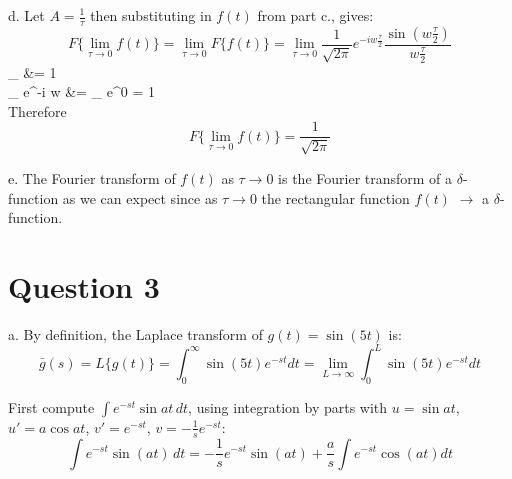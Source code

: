 \documentclass[12pt,twoside]{article}
\begin{document}
\item [d.]
Let $A=\frac{1}{\tau}$ then substituting in $f(t)$	from part c., gives:
\[
	F\{ \lim_{\tau \rightarrow 0} f(t) \} =  \lim_{\tau \rightarrow 0}  F\{ f(t) \} =  \lim_{\tau \rightarrow 0}   \frac{1}  {\sqrt{2 \pi}}  e^{-i w \frac{\tau}{2}} \frac{ \sin(w \frac{\tau}{2}) } {w \frac{\tau}{2}}
\]
\ba
	 \lim_{\theta {}} \frac{\sin(\theta)} {\theta} &= 1 ~  \\
	  \lim_{\tau {}}  e^{-i w } 		&=   \lim_{\tau {}} e^0 = 1 \\
\ea
Therefore
\[
	F\{ \lim_{\tau \rightarrow 0} f(t) \} =  \frac{1}  {\sqrt{2 \pi}} 
\]

\item [e.]
The Fourier transform of $f(t)$ as $\tau  \rightarrow 0$ is the Fourier transform of a $\delta$-function as we can expect since 
as   $\tau  \rightarrow 0$  the rectangular function $f(t)$  $\rightarrow$ a  $\delta$-function.
\ee

\section*{Question 3}

\be

\item [a.]
By definition, the Laplace transform of $g(t) = \sin(5t)$ is:
\[
	\bar{g}(s) = L\{g(t)\} = \int_0^\infty \sin(5t) e^{-st} dt = \lim_{L  \rightarrow \infty}  \int_0^L \sin(5t) e^{-st} dt
\]

First compute $\int e^{-st} \sin at \, dt$, using integration by parts with $u=\sin at$, $u' = a \cos at$, $v'=e^{-st}$, $v=-\frac{1}{s} e^{-st}$:
\begin{equation}
 \int e^{-st} \sin(at) \, dt = -\frac{1}{s} e^{-st} \sin(at) + \frac{a}{s} \int e^{-st} \cos(at) dt 
\end{equation}
\end{document}
